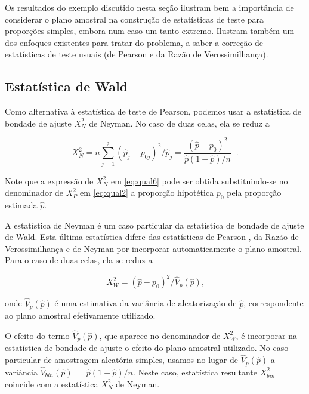 \documentclass[]{book}
\theoremstyle{definition}
\theoremstyle{definition}
\theoremstyle{definition}
\theoremstyle{remark}
\begin{document}
Os resultados do exemplo discutido nesta seção ilustram bem a
importância de considerar o plano amostral na construção de estatísticas
de teste para proporções simples, embora num caso um tanto extremo.
Ilustram também um dos enfoques existentes para tratar do problema, a
saber a correção de estatísticas de teste usuais (de Pearson e da Razão
de Verossimilhança).

\subsection{Estatística de Wald}\label{estatistica-de-wald}

Como alternativa à estatística de teste de Pearson, podemos usar a
estatística de bondade de ajuste \(X_{N}^{2}\) de Neyman. No caso de
duas celas, ela se reduz a

\begin{equation}
X_{N}^{2}=n\sum\limits_{j=1}^{2}\left( \hat{p}_{j}-p_{0j}\right) ^{2}/\hat{p}
_{j}=\frac{\left( \widehat{p}-p_{0}\right) ^{2}}{\hat{p}\left( 1-\hat{p}
\right) /n}\;\;\mbox{.}  
\label{eq:qual6}
\end{equation}

Note que a expressão de \(X_{N}^{2}\) em \eqref{eq:qual6} pode ser obtida
substituindo-se no denominador de \(X_{P}^{2}\) em \eqref{eq:qual2} a
proporção hipotética \(p_{0}\) pela proporção estimada \(\hat{p}\).

A estatística de Neyman é um caso particular da estatística de bondade
de ajuste de Wald. Esta última estatística difere das estatísticas de
Pearson , da Razão de Verossimilhança e de Neyman por incorporar
automaticamente o plano amostral. Para o caso de duas celas, ela se
reduz a

\begin{equation}
X_{W}^{2}=\left( \widehat{p}-p_{0}\right) ^{2}/\hat{V}_{p}\left( \widehat{p}
\right) \mbox{,}  
\label{eq:qual7}
\end{equation}

onde \(\hat{V}_{p}\left( \widehat{p}\right)\) é uma estimativa da
variância de aleatorização de \(\hat{p}\), correspondente ao plano
amostral efetivamente utilizado.

O efeito do termo \(\hat{V}_{p}\left( \widehat{p}\right)\), que aparece
no denominador de \(X_{W}^{2}\), é incorporar na estatística de bondade
de ajuste o efeito do plano amostral utilizado. No caso particular de
amostragem aleatória simples, usamos no lugar de
\(\widehat{V}_{p}\left( \widehat{p}\right)\) a variância
\(\widehat{V}_{bin}\left( \widehat{p}\right) =\)
\(\widehat{p}\left( 1-\widehat{p}\right) /n\). Neste caso, estatística
resultante \(X_{bin}^{2}\) coincide com a estatística \(X_{N}^{2}\) de
Neyman.
\end{document}
